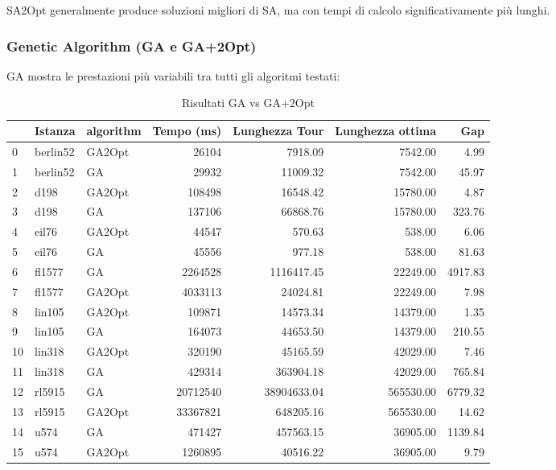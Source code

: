 SA2Opt generalmente produce soluzioni migliori di SA, ma con tempi di calcolo significativamente più lunghi.

\subsubsection{Genetic Algorithm (GA e GA+2Opt)}
GA mostra le prestazioni più variabili tra tutti gli algoritmi testati:

\begin{table}[H]
	\centering

	\caption{Risultati GA vs GA+2Opt}
	\begin{tabular}{lllrrrr}
		\toprule
		   & Istanza  & algorithm & Tempo (ms) & Lunghezza Tour & Lunghezza ottima & Gap     \\
		\midrule
		0  & berlin52 & GA2Opt    & 26104      & 7918.09        & 7542.00          & 4.99    \\
		1  & berlin52 & GA        & 29932      & 11009.32       & 7542.00          & 45.97   \\
		2  & d198     & GA2Opt    & 108498     & 16548.42       & 15780.00         & 4.87    \\
		3  & d198     & GA        & 137106     & 66868.76       & 15780.00         & 323.76  \\
		4  & eil76    & GA2Opt    & 44547      & 570.63         & 538.00           & 6.06    \\
		5  & eil76    & GA        & 45556      & 977.18         & 538.00           & 81.63   \\
		6  & fl1577   & GA        & 2264528    & 1116417.45     & 22249.00         & 4917.83 \\
		7  & fl1577   & GA2Opt    & 4033113    & 24024.81       & 22249.00         & 7.98    \\
		8  & lin105   & GA2Opt    & 109871     & 14573.34       & 14379.00         & 1.35    \\
		9  & lin105   & GA        & 164073     & 44653.50       & 14379.00         & 210.55  \\
		10 & lin318   & GA2Opt    & 320190     & 45165.59       & 42029.00         & 7.46    \\
		11 & lin318   & GA        & 429314     & 363904.18      & 42029.00         & 765.84  \\
		12 & rl5915   & GA        & 20712540   & 38904633.04    & 565530.00        & 6779.32 \\
		13 & rl5915   & GA2Opt    & 33367821   & 648205.16      & 565530.00        & 14.62   \\
		14 & u574     & GA        & 471427     & 457563.15      & 36905.00         & 1139.84 \\
		15 & u574     & GA2Opt    & 1260895    & 40516.22       & 36905.00         & 9.79    \\
		\bottomrule
	\end{tabular}
\end{table}

